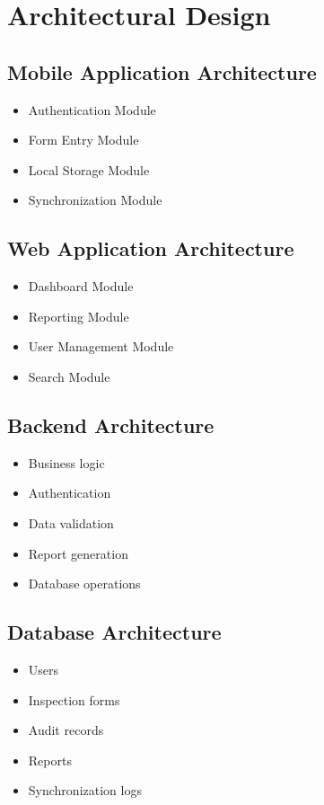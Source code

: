\documentclass[12pt]{article}
\begin{document}
\section{Architectural Design}

\subsection{Mobile Application Architecture}

\begin{itemize}
\item Authentication Module
\item Form Entry Module
\item Local Storage Module
\item Synchronization Module
\end{itemize}

\subsection{Web Application Architecture}

\begin{itemize}
\item Dashboard Module
\item Reporting Module
\item User Management Module
\item Search Module
\end{itemize}

\subsection{Backend Architecture}

\begin{itemize}
\item Business logic
\item Authentication
\item Data validation
\item Report generation
\item Database operations
\end{itemize}

\subsection{Database Architecture}

\begin{itemize}
\item Users
\item Inspection forms
\item Audit records
\item Reports
\item Synchronization logs
\end{itemize}
\end{document}
